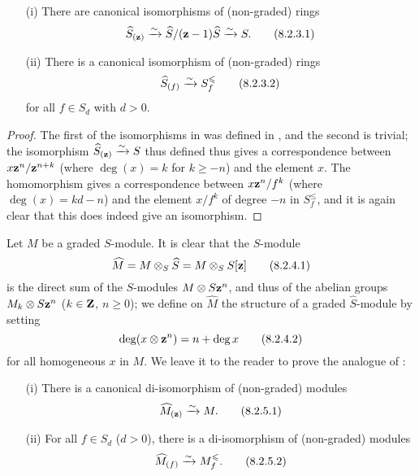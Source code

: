 \begin{lemma}[8.2.3]
\label{II.8.2.3}
\begin{enumerate}
  \item[\rm{(i)}] There are canonical isomorphisms of (non-graded) rings
    \[
    \label{II.8.2.3.1}
      \widehat{S}_{(\mathbf{z})}
      \xrightarrow{\sim}
      \widehat{S}/(\mathbf{z}-1)\widehat{S}
      \xrightarrow{\sim}
      S.
    \tag{8.2.3.1}
    \]
  \item[\rm{(ii)}] There is a canonical isomorphism of (non-graded) rings
    \[
    \label{II.8.2.3.2}
      \widehat{S}_{(f)} \xrightarrow{\sim} S_f^\leqslant
    \tag{8.2.3.2}
    \]
    for all $f\in S_d$ with $d>0$.
\end{enumerate}
\end{lemma}

\begin{proof}
The first of the isomorphisms in  was defined in , and the second is trivial;
the isomorphism $\widehat{S}_{(\mathbf{z})} \xrightarrow{\sim} S$ thus defined thus gives a correspondence between $x\mathbf{z}^n/\mathbf{z}^{n+k}$ (where $\deg(x) = k$ for $k\geq -n$) and the element $x$.
The homomorphism  gives a correspondence between $x\mathbf{z}^n/f^k$ (where $\deg(x) = kd-n$) and the element $x/f^k$ of degree $-n$ in $S_f^\leq$, and it is again clear that this does indeed give an isomorphism.
\end{proof}

\begin{env}[8.2.4]
\label{II.8.2.4}
Let $M$ be a graded $S$-module.
It is clear that the $S$-module
\[
\label{II.8.2.4.1}
  \widehat{M} = M \otimes_S \widehat{S} = M \otimes_S S[\mathbf{z}]
\tag{8.2.4.1}
\]
is the direct sum of the $S$-modules $M\otimes S\mathbf{z}^n$, and thus of the abelian groups $M_k\otimes S\mathbf{z}^n$ ($k\in\mathbf{Z}$, $n\geq0$);
we define on $\widehat{M}$ the structure of a graded $\widehat{S}$-module by setting
\[
\label{II.8.2.4.2}
  \deg(x\otimes\mathbf{z}^n) = n+\deg x
\tag{8.2.4.2}
\]
for all homogeneous $x$ in $M$.
We leave it to the reader to prove the analogue of :
\end{env}

\begin{lemma}[8.2.5]
\label{II.8.2.5}
\begin{enumerate}
  \item[\rm{(i)}] There is a canonical di-isomorphism of (non-graded) modules
    \[
    \label{II.8.2.5.1}
      \widehat{M}_{(\mathbf{z})} \xrightarrow{\sim} M.
    \tag{8.2.5.1}
    \]
  \item[\rm{(ii)}] For all $f\in S_d$ ($d>0$), there is a di-isomorphism of (non-graded) modules
    \[
    \label{II.8.2.5.2}
      \widehat{M}_{(f)} \xrightarrow{\sim} M_f^\leqslant.
    \tag{8.2.5.2}
    \]
\end{enumerate}
\end{lemma}

